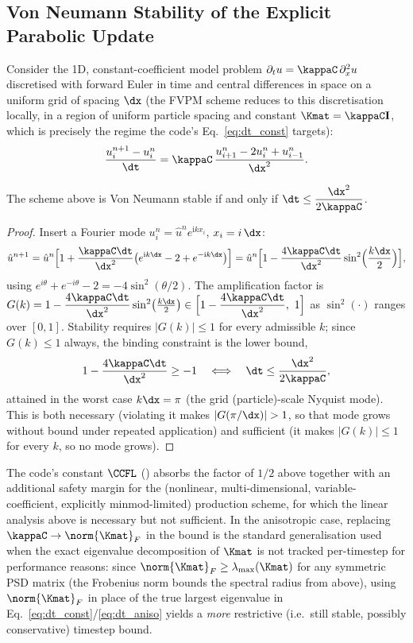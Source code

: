 \subsection{Von Neumann Stability of the Explicit Parabolic Update}
\label{app:von-neumann}
Consider the 1D, constant-coefficient model problem
$\partial_t u = \kappaC\,\partial_x^2 u$ discretised with forward Euler
in time and central differences in space on a uniform grid of spacing
$\dx$ (the FVPM scheme reduces to this discretisation locally, in a
region of uniform particle spacing and constant $\Kmat=\kappaC\mathbf I$,
which is precisely the regime the code's
Eq.~\eqref{eq:dt_const} targets):
\begin{equation}
  \frac{u_i^{n+1}-u_i^n}{\dt} = \kappaC\,\frac{u_{i+1}^n - 2u_i^n + u_{i-1}^n}{\dx^2} .
\end{equation}
\begin{proposition}
The scheme above is Von Neumann stable if and only if
$\dt \le \dfrac{\dx^2}{2\kappaC}$.
\end{proposition}
\begin{proof}
Insert a Fourier mode $u_i^n = \hat u^n e^{\mathrm i k x_i}$, $x_i = i\,\dx$:
\begin{equation}
  \hat u^{n+1} = \hat u^n\Big[1 + \frac{\kappaC\dt}{\dx^2}\big(e^{\mathrm i k\dx} - 2 + e^{-\mathrm i k\dx}\big)\Big]
  = \hat u^n\Big[1 - \frac{4\kappaC\dt}{\dx^2}\sin^2\!\Big(\frac{k\dx}{2}\Big)\Big] ,
\end{equation}
using $e^{i\theta}+e^{-i\theta}-2 = -4\sin^2(\theta/2)$. The amplification
factor is
$G(k) = 1 - \dfrac{4\kappaC\dt}{\dx^2}\sin^2\!\big(\tfrac{k\dx}{2}\big) \in
\Big[1-\dfrac{4\kappaC\dt}{\dx^2},\ 1\Big]$
as $\sin^2(\cdot)$ ranges over $[0,1]$. Stability requires
$|G(k)|\le 1$ for every admissible $k$; since $G(k)\le1$ always, the
binding constraint is the lower bound,
\begin{equation}
  1 - \frac{4\kappaC\dt}{\dx^2} \ge -1
  \quad\Longleftrightarrow\quad
  \dt \le \frac{\dx^2}{2\kappaC} ,
\end{equation}
attained in the worst case $k\dx=\pi$ (the grid (particle)-scale
Nyquist mode). This is both necessary (violating it makes $|G(\pi/\dx)|>1$,
so that mode grows without bound under repeated application) and
sufficient (it makes $|G(k)|\le1$ for every $k$, so no mode grows).
\end{proof}
The code's constant $\CCFL$ () absorbs
the factor of $1/2$ above together with an additional safety margin for
the (nonlinear, multi-dimensional, variable-coefficient, explicitly
minmod-limited) production scheme, for which the linear analysis above
is necessary but not sufficient. In the anisotropic case, replacing
$\kappaC \to \norm{\Kmat}_F$ in the bound is the standard generalisation
used when the exact eigenvalue decomposition of $\Kmat$ is not tracked
per-timestep for performance reasons: since
$\norm{\Kmat}_F \ge \lambda_{\max}(\Kmat)$ for any symmetric PSD matrix
(the Frobenius norm bounds the spectral radius from above), using
$\norm{\Kmat}_F$ in place of the true largest eigenvalue in
Eq.~\eqref{eq:dt_const}/\eqref{eq:dt_aniso} yields a \emph{more}
restrictive (i.e.\ still stable, possibly conservative) timestep bound.

